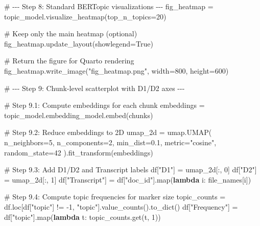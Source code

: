 \documentclass[
  letterpaper,
  DIV=11,
  numbers=noendperiod]{scrartcl}
\newenvironment{Shaded}{\begin{snugshade}}{\end{snugshade}}
\newcommand{\BuiltInTok}[1]{\textcolor[rgb]{0.00,0.23,0.31}{#1}}
\newcommand{\CommentTok}[1]{\textcolor[rgb]{0.37,0.37,0.37}{#1}}
\newcommand{\DecValTok}[1]{\textcolor[rgb]{0.68,0.00,0.00}{#1}}
\newcommand{\FloatTok}[1]{\textcolor[rgb]{0.68,0.00,0.00}{#1}}
\newcommand{\KeywordTok}[1]{\textcolor[rgb]{0.00,0.23,0.31}{\textbf{#1}}}
\newcommand{\NormalTok}[1]{\textcolor[rgb]{0.00,0.23,0.31}{#1}}
\newcommand{\OperatorTok}[1]{\textcolor[rgb]{0.37,0.37,0.37}{#1}}
\newcommand{\StringTok}[1]{\textcolor[rgb]{0.13,0.47,0.30}{#1}}
\newcommand{\VariableTok}[1]{\textcolor[rgb]{0.07,0.07,0.07}{#1}}
\begin{document}
\begin{Shaded}
\begin{Highlighting}[]
\CommentTok{\# {-}{-}{-} Step 8: Standard BERTopic visualizations {-}{-}{-}}
\NormalTok{fig\_heatmap }\OperatorTok{=}\NormalTok{ topic\_model.visualize\_heatmap(top\_n\_topics}\OperatorTok{=}\DecValTok{20}\NormalTok{)}

\CommentTok{\# Keep only the main heatmap (optional)}
\NormalTok{fig\_heatmap.update\_layout(showlegend}\OperatorTok{=}\VariableTok{True}\NormalTok{)  }

\CommentTok{\# Return the figure for Quarto rendering}
\NormalTok{fig\_heatmap.write\_image(}\StringTok{"fig\_heatmap.png"}\NormalTok{, width}\OperatorTok{=}\DecValTok{800}\NormalTok{, height}\OperatorTok{=}\DecValTok{600}\NormalTok{)}

\CommentTok{\# {-}{-}{-} Step 9: Chunk{-}level scatterplot with D1/D2 axes {-}{-}{-}}

\CommentTok{\# Step 9.1: Compute embeddings for each chunk}
\NormalTok{embeddings }\OperatorTok{=}\NormalTok{ topic\_model.embedding\_model.embed(chunks)}

\CommentTok{\# Step 9.2: Reduce embeddings to 2D}
\NormalTok{umap\_2d }\OperatorTok{=}\NormalTok{ umap.UMAP(}
\NormalTok{    n\_neighbors}\OperatorTok{=}\DecValTok{5}\NormalTok{,}
\NormalTok{    n\_components}\OperatorTok{=}\DecValTok{2}\NormalTok{,}
\NormalTok{    min\_dist}\OperatorTok{=}\FloatTok{0.1}\NormalTok{,}
\NormalTok{    metric}\OperatorTok{=}\StringTok{"cosine"}\NormalTok{,}
\NormalTok{    random\_state}\OperatorTok{=}\DecValTok{42}
\NormalTok{).fit\_transform(embeddings)}

\CommentTok{\# Step 9.3: Add D1/D2 and Transcript labels}
\NormalTok{df[}\StringTok{"D1"}\NormalTok{] }\OperatorTok{=}\NormalTok{ umap\_2d[:, }\DecValTok{0}\NormalTok{]}
\NormalTok{df[}\StringTok{"D2"}\NormalTok{] }\OperatorTok{=}\NormalTok{ umap\_2d[:, }\DecValTok{1}\NormalTok{]}
\NormalTok{df[}\StringTok{"Transcript"}\NormalTok{] }\OperatorTok{=}\NormalTok{ df[}\StringTok{"doc\_id"}\NormalTok{].}\BuiltInTok{map}\NormalTok{(}\KeywordTok{lambda}\NormalTok{ i: file\_names[i])}

\CommentTok{\# Step 9.4: Compute topic frequencies for marker size}
\NormalTok{topic\_counts }\OperatorTok{=}\NormalTok{ df.loc[df[}\StringTok{"topic"}\NormalTok{] }\OperatorTok{!=} \OperatorTok{{-}}\DecValTok{1}\NormalTok{, }\StringTok{"topic"}\NormalTok{].value\_counts().to\_dict()}
\NormalTok{df[}\StringTok{"Frequency"}\NormalTok{] }\OperatorTok{=}\NormalTok{ df[}\StringTok{"topic"}\NormalTok{].}\BuiltInTok{map}\NormalTok{(}\KeywordTok{lambda}\NormalTok{ t: topic\_counts.get(t, }\DecValTok{1}\NormalTok{))}


\end{Highlighting}
\end{Shaded}
\end{document}
